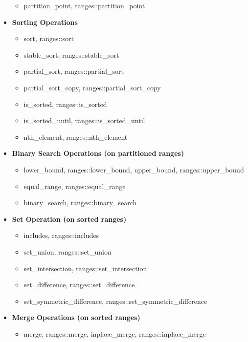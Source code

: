 \documentclass{article}
\begin{document}
\begin{itemize}
\begin{itemize}
            \item partition\_point, ranges::partition\_point
          \end{itemize}
        \item \textbf{Sorting Operations}
          \begin{itemize}
            \item sort, ranges::sort
            \item stable\_sort, ranges::stable\_sort
            \item partial\_sort, ranges::partial\_sort
            \item partial\_sort\_copy, ranges::partial\_sort\_copy
            \item is\_sorted, ranges::is\_sorted
            \item is\_sorted\_until, ranges::is\_sorted\_until
            \item nth\_element, ranges::nth\_element
          \end{itemize}
        \item \textbf{Binary Search Operations (on partitioned ranges)}
          \begin{itemize}
            \item lower\_bound, ranges::lower\_bound, upper\_bound, ranges::upper\_bound
            \item equal\_range, ranges::equal\_range
            \item binary\_search, ranges::binary\_search
          \end{itemize}
        \item \textbf{Set Operation (on sorted ranges)}
          \begin{itemize}
            \item includes, ranges::includes
            \item set\_union, ranges::set\_union
            \item set\_intersection, ranges::set\_intersection
            \item set\_difference, ranges::set\_difference
            \item set\_symmetric\_difference, ranges::set\_symmetric\_difference
          \end{itemize}
        \item \textbf{Merge Operations (on sorted ranges)}
          \begin{itemize}
            \item merge, ranges::merge, inplace\_merge, ranges::inplace\_merge

\end{itemize}
\end{itemize}
\end{document}
